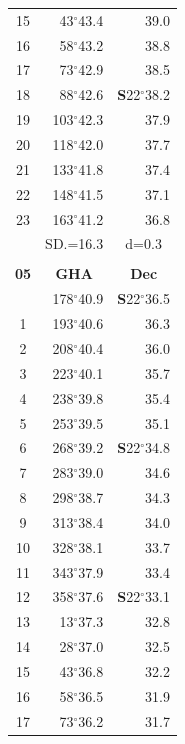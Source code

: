 \documentclass[10pt, a4paper]{report}
\begin{document}
\begin{scriptsize}
\begin{tabular*}{0.2\textwidth}[t]{@{\extracolsep{\fill}}|c|rr|}
15 & 43$^\circ$43.4 & \raisebox{0.24ex}{\boldmath$\cdot$~\boldmath$\cdot$~~}39.0\\
16 & 58$^\circ$43.2 & 38.8\\
17 & 73$^\circ$42.9 & 38.5\\[2Pt]
18 & 88$^\circ$42.6 & \textbf{S}22$^\circ$38.2\\
19 & 103$^\circ$42.3 & 37.9\\
20 & 118$^\circ$42.0 & 37.7\\
21 & 133$^\circ$41.8 & \raisebox{0.24ex}{\boldmath$\cdot$~\boldmath$\cdot$~~}37.4\\
22 & 148$^\circ$41.5 & 37.1\\
23 & 163$^\circ$41.2 & 36.8\\
\hline
\rule{0pt}{2.4ex} & \multicolumn{1}{c}{SD.=16.3} & \multicolumn{1}{c|}{d=0.3}\\
\hline
\multicolumn{1}{c}{}\\[-0.5ex]\hline
\multicolumn{1}{|c|}{\rule{0pt}{2.6ex}\textbf{05}} & \multicolumn{1}{c}{\textbf{GHA}} & \multicolumn{1}{c|}{\textbf{Dec}}\\
\hline\rule{0pt}{2.6ex}\noindent
0 & 178$^\circ$40.9 & \textbf{S}22$^\circ$36.5\\
1 & 193$^\circ$40.6 & 36.3\\
2 & 208$^\circ$40.4 & 36.0\\
3 & 223$^\circ$40.1 & \raisebox{0.24ex}{\boldmath$\cdot$~\boldmath$\cdot$~~}35.7\\
4 & 238$^\circ$39.8 & 35.4\\
5 & 253$^\circ$39.5 & 35.1\\[2Pt]
6 & 268$^\circ$39.2 & \textbf{S}22$^\circ$34.8\\
7 & 283$^\circ$39.0 & 34.6\\
8 & 298$^\circ$38.7 & 34.3\\
9 & 313$^\circ$38.4 & \raisebox{0.24ex}{\boldmath$\cdot$~\boldmath$\cdot$~~}34.0\\
10 & 328$^\circ$38.1 & 33.7\\
11 & 343$^\circ$37.9 & 33.4\\[2Pt]
12 & 358$^\circ$37.6 & \textbf{S}22$^\circ$33.1\\
13 & 13$^\circ$37.3 & 32.8\\
14 & 28$^\circ$37.0 & 32.5\\
15 & 43$^\circ$36.8 & \raisebox{0.24ex}{\boldmath$\cdot$~\boldmath$\cdot$~~}32.2\\
16 & 58$^\circ$36.5 & 31.9\\
17 & 73$^\circ$36.2 & 31.7\\[2Pt]

\end{tabular*}
\end{scriptsize}
\end{document}
